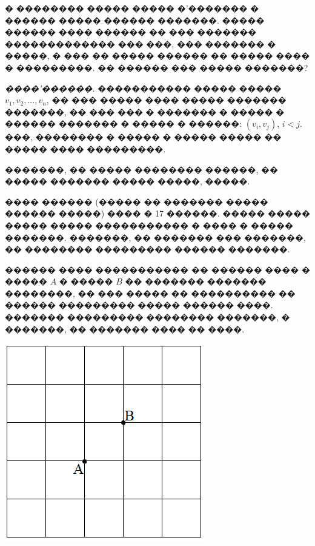 \documentclass[a4paper,12pt]{article}
\begin{document}
\begin{enumerate}
\item � �������� ����� ����� �'������� � ������ ����� ������ �������. ����� ������ ���� ������ �� ��� ������� ������������� ��� ���, ��� ������� � �����, � ��� �� ����� ������ �� ����� ���� � ���������. �� ������ ��� ����� �������?

\textit{����'������.} ����������� ����� ����� $v_{1},v_{2},...,v_{n}$, �� ��� ����� ���� ����� ������� �������, �� ��� ��� � ������� � ����� � ������ ������� � ����� � ������: $(v_{i},v_{j})$, $i<j$. ���, �������� � ����� � ����� ����� �� ����� ���� ���������.

\item �������, �� ����� �������� ������, �� ����� ������� ����� �����, �����.

\item ���� ������ (����� �� ������� ����� ������ �����) ���� � 17 ������. ����� ����� ����� ����� ����������� � ���� � ����� �������. �������, �� ������� ��� �������, �� �������� ��������� ������ �������.


\begin{minipage}{.35\textwidth}
       \item ������ ���� ����������� �� ������ ���� � ����� $A$ � ����� $B$ �� ������� ������� ��������, �� ��� ����� �� ���������� �� ������ ��������� ����� ������ ����. ������� ��������� �������� �������, � �������, �� ������� ���� �� ����.

\end{minipage}
\begin{minipage}{.55\textwidth}
\begin{center}
\includegraphics[scale=0.4]{grid}
\end{center}
\end{minipage}





\end{enumerate}
\end{document}
